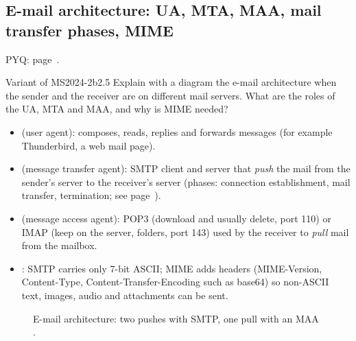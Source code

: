 \subsection{E-mail architecture: UA, MTA, MAA, mail transfer phases, MIME}\label{iq:C15}
     \quad PYQ: page~\pageref{q:MS2024-2b}.
\begin{question}{Variant of MS2024-2b}{2.5}
Explain with a diagram the e-mail architecture when the sender and the receiver are on different mail servers. What are the roles of the UA, MTA and MAA, and why is MIME needed?
\end{question}
\begin{solution}[outline]
\begin{itemize}
\item {} (user agent): composes, reads, replies and forwards messages (for example Thunderbird, a web mail page).
\item {} (message transfer agent): SMTP client and server that \emph{push} the mail from the sender's server to the receiver's server (phases: connection establishment, mail transfer, termination; see page~\pageref{iq:C16}).
\item {} (message access agent): POP3 (download and usually delete, port 110) or IMAP (keep on the server, folders, port 143) used by the receiver to \emph{pull} mail from the mailbox.
\item {}: SMTP carries only 7-bit ASCII; MIME adds headers (MIME-Version, Content-Type, Content-Transfer-Encoding such as base64) so non-ASCII text, images, audio and attachments can be sent.
\end{itemize}
\end{solution}
\begin{figure}[H]\centering
{}
\caption{E-mail architecture: two pushes with SMTP, one pull with an MAA .}\end{figure}

